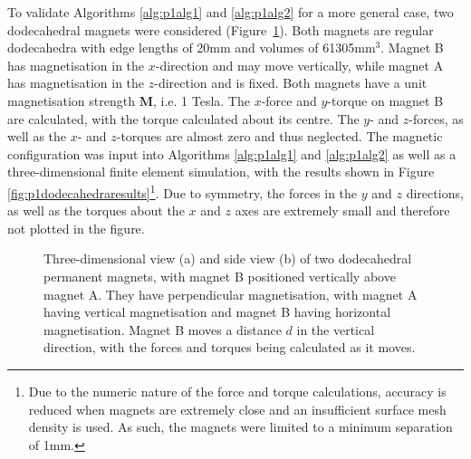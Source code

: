 To validate Algorithms \ref{alg:p1alg1} and \ref{alg:p1alg2} for a more general case, two dodecahedral magnets were considered (Figure~\ref{fig:p1dodecahedra}). Both magnets are regular dodecahedra with edge lengths of 20mm and volumes of 61305mm\(^3\). Magnet B has magnetisation in the \(x\)-direction and may move vertically, while magnet A has magnetisation in the \(z\)-direction and is fixed. Both magnets have a unit magnetisation strength \(\mathbf{M}\), i.e. 1 Tesla. The \(x\)-force and \(y\)-torque on magnet B are calculated, with the torque calculated about its centre. The \(y\)- and \(z\)-forces, as well as the \(x\)- and \(z\)-torques are almost zero and thus neglected. The magnetic configuration was input into Algorithms \ref{alg:p1alg1} and \ref{alg:p1alg2} as well as a  three-dimensional finite element simulation, with the results shown in Figure \ref{fig:p1dodecahedraresults}\footnote{Due to the numeric nature of the force and torque calculations, accuracy is reduced when magnets are extremely close and an insufficient surface mesh density is used. As such, the magnets were limited to a minimum separation of 1mm.}. Due to symmetry, the forces in the \(y\) and \(z\) directions, as well as the torques about the \(x\) and \(z\) axes are extremely small and therefore not plotted in the figure.
\begin{figure}
	\centering
	
	\caption{Three-dimensional view (a) and side view (b) of two dodecahedral permanent magnets, with magnet B positioned vertically above magnet A. They have perpendicular magnetisation, with magnet A having vertical magnetisation and magnet B having horizontal magnetisation. Magnet B moves a distance \(d\) in the vertical direction, with the forces and torques being calculated as it moves.}
	\label{fig:p1dodecahedra}
\end{figure}

